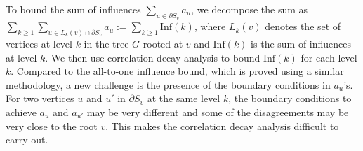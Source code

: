 \documentclass[11pt]{amsart}
\newcommand{\defeq}{:=}
\theoremstyle{definition}
\theoremstyle{remark}
\begin{document}

To bound the sum of influences $\sum_{u \in \partial S_v} a_u$, we decompose the sum as $\sum_{k \geq 1} \sum_{u \in L_k(v) \cap \partial S_v}a_u \defeq \sum_{k \geq 1} \text{Inf}(k)$, where $L_k(v)$ denotes the set of vertices at level $k$ in the tree $G$ rooted at $v$ and $\text{Inf}(k)$ is the sum of influences at level $k$. 
We then use correlation decay analysis to bound $\text{Inf}(k)$ for each level $k$.
Compared to the all-to-one influence bound, which is proved using a similar methodology, a new challenge is the presence of the boundary conditions in $a_u$'s.
For two vertices $u$ and $u'$ in $\partial S_v$ at the same level $k$, 
the boundary conditions to achieve $a_{u}$ and $a_{u'}$ may be very different and some of the disagreements may be very close to the root $v$.
This makes the correlation decay analysis difficult to carry out.
\end{document}
